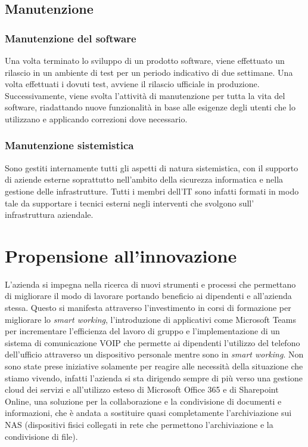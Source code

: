 \subsection{Manutenzione}
 
 \subsubsection{Manutenzione del software}
 Una volta terminato lo sviluppo di un prodotto software, viene effettuato un rilascio in un ambiente di test per un periodo indicativo di due settimane. Una volta effettuati i dovuti test, avviene il rilascio ufficiale in produzione. 
 Successivamente, viene svolta l'attività di manutenzione per tutta la vita del software, riadattando nuove funzionalità in base alle esigenze degli utenti che lo utilizzano e applicando correzioni dove necessario.
 
 \subsubsection{Manutenzione sistemistica}
 
Sono gestiti internamente tutti gli aspetti di natura sistemistica, con il supporto di aziende esterne soprattutto nell'ambito della sicurezza informatica e nella gestione delle infrastrutture. Tutti i membri dell'IT sono infatti formati in modo tale da supportare i tecnici esterni negli interventi che svolgono sull' infrastruttura aziendale.



\section{Propensione all'innovazione}

L'azienda si impegna nella ricerca di nuovi strumenti e processi che permettano di migliorare il modo di lavorare portando beneficio ai dipendenti e all'azienda stessa. 
Questo si manifesta attraverso l'investimento in corsi di formazione per migliorare lo \textit{smart working}, l'introduzione di applicativi come Microsoft Teams per incrementare l'efficienza del lavoro di gruppo e l'implementazione di un sistema di comunicazione VOIP che permette ai dipendenti l'utilizzo del telefono dell'ufficio attraverso un dispositivo personale mentre sono in \textit{smart working}. 
Non sono state prese iniziative solamente per reagire alle necessità della situazione che stiamo vivendo, infatti l'azienda si sta dirigendo sempre di più verso una gestione cloud dei servizi e all'utilizzo esteso di Microsoft Office 365 e di Sharepoint Online, una soluzione per la collaborazione e la condivisione di documenti e informazioni, che è andata a sostituire quasi completamente l'archiviazione sui NAS (dispositivi fisici collegati in rete che permettono l'archiviazione e la condivisione di file).


